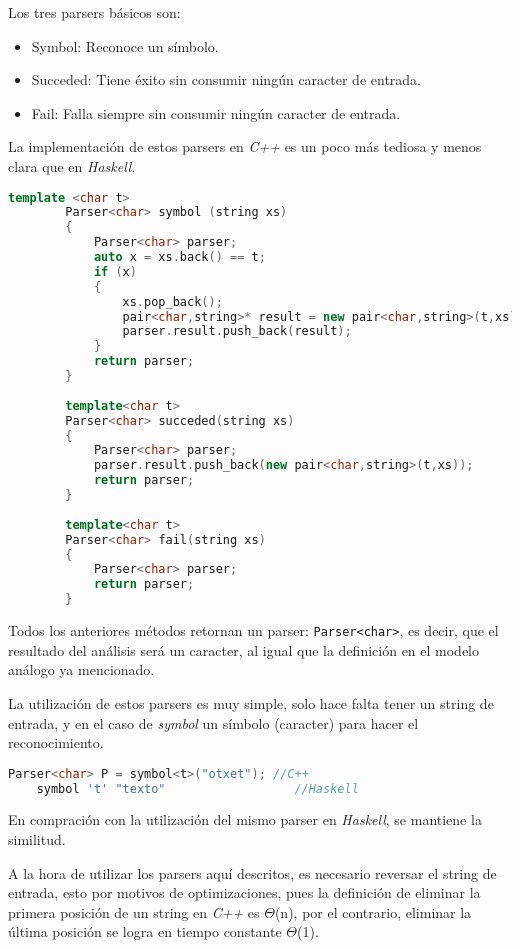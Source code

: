	Los tres parsers básicos son:
	\begin{itemize}
		\item Symbol: Reconoce un símbolo.
		\item Succeded: Tiene éxito sin consumir ningún caracter de entrada.
		\item Fail: Falla siempre sin consumir ningún caracter de entrada.
	\end{itemize}
	
	La implementación de estos parsers en \emph{C++} es un poco más tediosa y menos clara que en \emph{Haskell}.
	
	\begin{lstlisting}[language=C++, caption="Parsers básicos"]
		template <char t>
		Parser<char> symbol (string xs)
		{
			Parser<char> parser;
			auto x = xs.back() == t;
			if (x)
			{
				xs.pop_back();
				pair<char,string>* result = new pair<char,string>(t,xs);
				parser.result.push_back(result);
			}			
			return parser;
		}
		
		template<char t>
		Parser<char> succeded(string xs)
		{
			Parser<char> parser;
			parser.result.push_back(new pair<char,string>(t,xs));
			return parser;
		}
		
		template<char t>
		Parser<char> fail(string xs)
		{
			Parser<char> parser;
			return parser;
		}		
	\end{lstlisting}
	
	Todos los anteriores métodos retornan un parser: \texttt{Parser<char>}, es decir, que el resultado del análisis será un caracter, al igual que la definición en el modelo análogo ya mencionado.
	
	La utilización de estos parsers es muy simple, solo hace falta tener un string de entrada, y en el caso de \emph{symbol} un símbolo (caracter) para hacer el reconocimiento.
	
	\begin{lstlisting}[language=C++]
	Parser<char> P = symbol<t>("otxet"); //C++
	symbol 't' "texto"					//Haskell
	\end{lstlisting}
	En compración con la utilización del mismo parser en \emph{Haskell}, se mantiene la similitud.
	
	A la hora de utilizar los parsers aquí descritos, es necesario reversar el string de entrada, esto por motivos de optimizaciones, pues la definición de eliminar la primera posición de un string en \emph{C++} es $\Theta$(n), por el contrario, eliminar la última posición se logra en tiempo constante $\Theta$(1).
	

